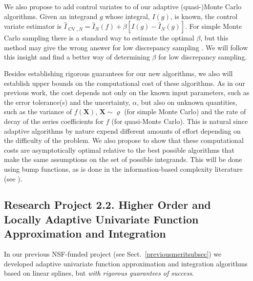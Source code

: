 \documentclass[11pt]{NSFamsart}
\newcommand{\hI}{\hat{I}}
\DeclareMathOperator{\CV}{CV}
\newcommand{\bX}{{\boldsymbol{X}}}
\begin{document}
We also propose to add control variates to of our adaptive (quasi-)Monte Carlo algorithms.  Given an integrand $g$ whose integral, $I(g)$, is known, the control variate estimator is $\hI_{\CV,N}=\hI_N(f) + \beta [ I(g) - \hI_N(g)]$.  For simple Monte Carlo sampling there is a standard way to estimate the optimal $\beta$, but this method may give the wrong answer for low discrepancy sampling \citep{HicEtal03}.  We will follow this insight and find a better way of determining $\beta$ for low discrepancy sampling.

Besides establishing rigorous guarantees for our new algorithms, we also will establish upper bounds on the computational cost of these algorithms.  As in our previous work, the cost depends not only on the known input parameters, such as the error tolerance(s) and the uncertainty, $\alpha$, but also on unknown quantities, such as the variance of $f(\bX)$, $\bX \sim \varrho$ (for simple Monte Carlo) and the rate of decay of the series coefficients for $f$ (for quasi-Monte Carlo).  This is natural since adaptive algorithms by nature expend different amounts of effort depending on the difficulty of the problem.  We also propose to show that these computational costs are asymptotically optimal relative to the best possible algorithms that make the same assumptions on the set of possible integrands.  This will be done using bump functions, as is done in the information-based complexity literature (see \cite{TraWasWoz88,Nov88}).

\subsection*{Research Project 2.2. Higher Order and Locally Adaptive Univariate Function Approximation and Integration}
In our previous NSF-funded project (see Sect.\ \ref{previousmeritsubsec}) we developed adaptive univariate function approximation and integration algorithms based on linear splines, but \emph{with rigorous guarantees of success}.
\end{document}
